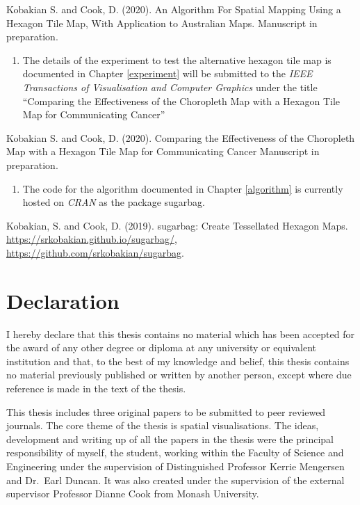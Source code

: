\documentclass{monashthesis}
\begin{document}
Kobakian S. and Cook, D. (2020). An Algorithm For Spatial Mapping Using a Hexagon Tile Map, With Application to Australian Maps. Manuscript in preparation.

\begin{enumerate}
\def\labelenumi{\arabic{enumi}.}
\setcounter{enumi}{2}
\tightlist
\item
  The details of the experiment to test the alternative hexagon tile map is documented in Chapter \ref{experiment} will be submitted to the \emph{IEEE Transactions of Visualisation and Computer Graphics} under the title ``Comparing the Effectiveness of the Choropleth Map with a Hexagon Tile Map for Communicating Cancer''
\end{enumerate}

Kobakian S. and Cook, D. (2020). Comparing the Effectiveness of the Choropleth Map with a Hexagon Tile Map for Communicating Cancer Manuscript in preparation.

\begin{enumerate}
\def\labelenumi{\arabic{enumi}.}
\setcounter{enumi}{3}
\tightlist
\item
  The code for the algorithm documented in Chapter \ref{algorithm} is currently hosted on \emph{CRAN} as the package sugarbag.
\end{enumerate}

Kobakian, S. and Cook, D. (2019). sugarbag: Create Tessellated Hexagon Maps. \url{https://srkobakian.github.io/sugarbag/}, \url{https://github.com/srkobakian/sugarbag}.

\clearpage{}\setcounter{page}{0}

\hypertarget{declaration}{%
\chapter*{Declaration}\label{declaration}}

I hereby declare that this thesis contains no material which has been accepted for the award of any other degree or diploma at any university or equivalent institution and that, to the best of my knowledge and belief, this thesis contains no material previously published or written by another person, except where due reference is made in the text of the thesis.

This thesis includes three original papers to be submitted to peer reviewed journals. The core theme of the thesis is spatial visualisations. The ideas, development and writing up of all the papers in the thesis were the principal responsibility of myself, the student, working within the Faculty of Science and Engineering under the supervision of Distinguished Professor Kerrie Mengersen and Dr.~Earl Duncan. It was also created under the supervision of the external supervisor Professor Dianne Cook from Monash University.
\end{document}
